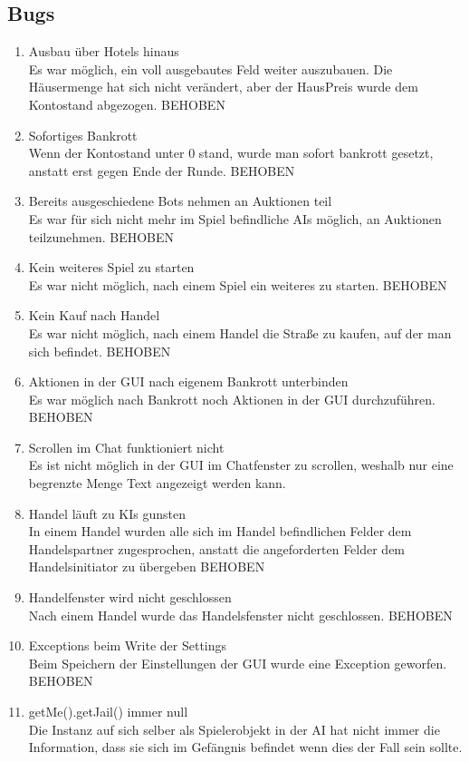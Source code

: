 \documentclass[a4paper,10pt]{article}
\begin{document}
\subsection{Bugs}
\begin{enumerate}
\item Ausbau über Hotels hinaus
\\Es war möglich, ein voll ausgebautes Feld weiter auszubauen. Die Häusermenge hat sich nicht verändert, aber der HausPreis wurde dem Kontostand abgezogen. BEHOBEN 
\item Sofortiges Bankrott
\\Wenn der Kontostand unter 0 stand, wurde man sofort bankrott gesetzt, anstatt erst gegen Ende der Runde. BEHOBEN
\item Bereits ausgeschiedene Bots nehmen an Auktionen teil
\\Es war für sich nicht mehr im Spiel befindliche AIs möglich, an Auktionen teilzunehmen. BEHOBEN
\item Kein weiteres Spiel zu starten
\\Es war nicht möglich, nach einem Spiel ein weiteres zu starten. BEHOBEN
\item Kein Kauf nach Handel
\\Es war nicht möglich, nach einem Handel die Straße zu kaufen, auf der man sich befindet. BEHOBEN
\item Aktionen in der GUI nach eigenem Bankrott unterbinden
\\Es war möglich nach Bankrott noch Aktionen in der GUI durchzuführen. BEHOBEN
\item Scrollen im Chat funktioniert nicht
\\Es ist nicht möglich in der GUI im Chatfenster zu scrollen, weshalb nur eine begrenzte Menge Text angezeigt werden kann.
\item Handel läuft zu KIs gunsten
\\In einem Handel wurden alle sich im Handel befindlichen Felder dem Handelspartner zugesprochen, anstatt die angeforderten Felder dem Handelsinitiator zu übergeben BEHOBEN
\item Handelfenster wird nicht geschlossen
\\Nach einem Handel wurde das Handelsfenster nicht geschlossen. BEHOBEN
\item Exceptions beim Write der Settings
\\Beim Speichern der Einstellungen der GUI wurde eine Exception geworfen. BEHOBEN
\item getMe().getJail() immer null
\\Die Instanz auf sich selber als Spielerobjekt in der AI hat nicht immer die Information, dass sie sich im Gefängnis befindet wenn dies der Fall sein sollte.

\end{enumerate}
\end{document}
